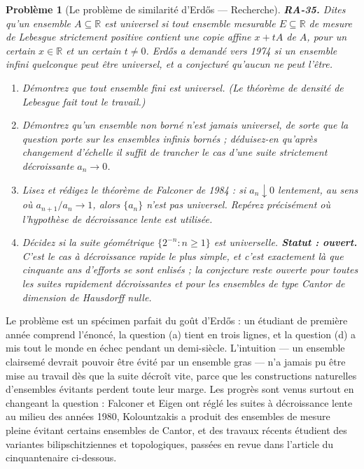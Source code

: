 \documentclass[11pt]{article}
\newtheorem{problem}{Problème}
\begin{document}
\begin{problem}[{Le problème de similarité d'Erd\H{o}s --- Recherche}]
\textbf{RA-35.} Dites qu'un ensemble $ A \subseteq \mathbb{R} $ est \textit{universel} si tout
ensemble mesurable $ E \subseteq \mathbb{R} $ de mesure de Lebesgue strictement positive contient
une copie affine $ x + tA $ de $ A $, pour un certain $ x \in \mathbb{R} $ et un certain
$ t \ne 0 $. Erd\H{o}s a demandé vers 1974 si un ensemble infini quelconque peut être universel, et a
conjecturé qu'aucun ne peut l'être.
\begin{enumerate}
\item[(a)] Démontrez que tout ensemble fini est universel. (Le théorème de densité de Lebesgue fait tout le
travail.)
\item[(b)] Démontrez qu'un ensemble non borné n'est jamais universel, de sorte que la question porte sur
les ensembles infinis bornés ; déduisez-en qu'après changement d'échelle il suffit de trancher le
cas d'une suite strictement décroissante $ a_n \to 0 $.
\item[(c)] Lisez et rédigez le théorème de Falconer de 1984 : si $ a_n \downarrow 0 $ lentement, au sens
où $ a_{n+1} / a_n \to 1 $, alors $ \{ a_n \} $ n'est pas universel. Repérez précisément où
l'hypothèse de décroissance lente est utilisée.
\item[(d)] Décidez si la suite géométrique $ \{ 2^{-n} : n \ge 1 \} $ est universelle.
\textbf{Statut : ouvert.} C'est le cas à décroissance rapide le plus simple, et c'est exactement là que
cinquante ans d'efforts se sont enlisés ; la conjecture reste ouverte pour toutes les suites
rapidement décroissantes et pour les ensembles de type Cantor de dimension de Hausdorff nulle.
\end{enumerate}

\end{problem}

\noindent Le problème est un spécimen parfait du goût d'Erd\H{o}s : un étudiant de première
année comprend l'énoncé, la question (a) tient en trois lignes, et la question (d) a mis tout le
monde en échec pendant un demi-siècle. L'intuition --- un ensemble clairsemé devrait pouvoir être
évité par un ensemble gras --- n'a jamais pu être mise au travail dès que la suite décroît vite, parce
que les constructions naturelles d'ensembles évitants perdent toute leur marge. Les progrès sont
venus surtout en changeant la question : Falconer et Eigen ont réglé les suites à décroissance lente
au milieu des années 1980, Kolountzakis a produit des ensembles de mesure pleine évitant certains
ensembles de Cantor, et des travaux récents étudient des variantes bilipschitziennes et
topologiques, passées en revue dans l'article du cinquantenaire ci-dessous.
\end{document}
